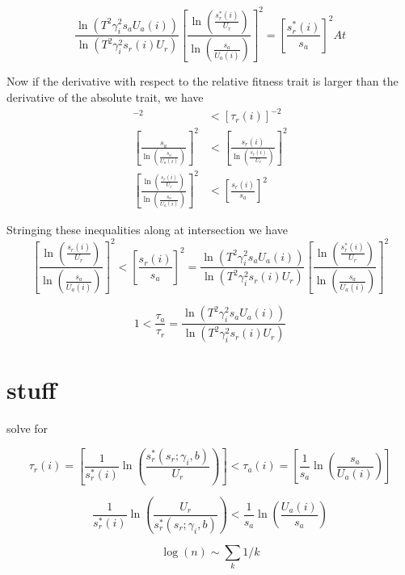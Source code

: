 \documentclass[9pt,twocolumn,twoside]{article}
\begin{document}
\begin{appendix}
$$ \frac{\ln (T^2  \gamma_{i}^2 s_{a} U_{a}(i))}{\ln (T^2  \gamma_{i}^2 s_{r}(i) U_{r})} \left[ \frac{\ln \left(\frac{s_{r}^{*}(i)}{U_{r}}\right)}{\ln \left(\frac{s_{a}}{U_{a}(i)}\right)} \right]^{2} = \left[\frac{s_{r}^{*}(i)}{s_{a}} \right]^{2}At $$


Now if the derivative with respect to the relative fitness trait is larger than the derivative of the absolute trait, we have 
\begin{align*}
    [\tau_{a}(i)]^{-2} & < [\tau_{r}(i)]^{-2} \\
    \left [ \frac{s_{a}}{\ln \left(\frac{s_{a}}{U_{a}(i)}\right)}\right]^{2} & < \left [ \frac{s_{r}(i)}{\ln \left(\frac{s_{r}(i)}{U_{r}}\right)}\right]^{2} \\
    \left [ \frac{\ln \left(\frac{s_{r}(i)}{U_{r}}\right)}{\ln \left(\frac{s_{a}}{U_{a}(i)}\right)}\right]^{2} & < \left [ \frac{s_{r}(i)}{s_{a}}\right]^{2}
\end{align*}

Stringing these inequalities along at intersection we have
$$ \left [ \frac{\ln \left(\frac{s_{r}(i)}{U_{r}}\right)}{\ln \left(\frac{s_{a}}{U_{a}(i)}\right)}\right]^{2}  < \left [ \frac{s_{r}(i)}{s_{a}}\right]^{2} = \frac{\ln (T^2  \gamma_{i}^2 s_{a} U_{a}(i))}{\ln (T^2  \gamma_{i}^2 s_{r}(i) U_{r})} \left[ \frac{\ln \left(\frac{s_{r}^{*}(i)}{U_{r}}\right)}{\ln \left(\frac{s_{a}}{U_{a}(i)}\right)} \right]^{2}  $$

$$ 1  <  \frac{\tau_{a}}{\tau_{r}} = \frac{\ln (T^2  \gamma_{i}^2 s_{a} U_{a}(i))}{\ln (T^2  \gamma_{i}^2 s_{r}(i) U_{r})} $$

\section{stuff}
solve for 

$$\tau_{r}(i) = \left[\frac{1}{s_{r}^{*}(i)}\ln \left(\frac{s_{r}^{*}(s_{r};\gamma_{i},b)}{U_{r}}\right)\right] < \tau_{a}(i) = \left[\frac{1}{s_{a}}\ln \left(\frac{s_{a}}{U_{a}(i)}\right)\right]$$

$$\frac{1}{s_{r}^{*}(i)}\ln \left(\frac{U_{r}}{s_{r}^{*}(s_{r};\gamma_{i},b)}\right) < \frac{1}{s_{a}}\ln \left(\frac{U_{a}(i)}{s_{a}}\right)$$

$$\log(n) \sim \sum_{k}{1/k}$$

\end{appendix}
\end{document}
